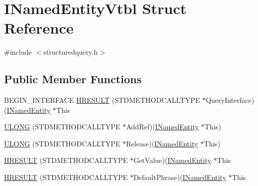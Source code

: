 \hypertarget{struct_i_named_entity_vtbl}{}\section{I\+Named\+Entity\+Vtbl Struct Reference}
\label{struct_i_named_entity_vtbl}


{\ttfamily \#include $<$structuredquery.\+h$>$}

\subsection*{Public Member Functions}
\begin{DoxyCompactItemize}
\item 
B\+E\+G\+I\+N\+\_\+\+I\+N\+T\+E\+R\+F\+A\+CE \hyperlink{struct_i_named_entity_vtbl_a8566536b76c1cc4b2bc33fb0798ad014}{H\+R\+E\+S\+U\+LT} (S\+T\+D\+M\+E\+T\+H\+O\+D\+C\+A\+L\+L\+T\+Y\+PE $\ast$Query\+Interface)(\hyperlink{structuredquery_8h_a362b4bd35d6ac9db4ca890a7847c8b21}{I\+Named\+Entity} $\ast$This
\item 
\hyperlink{struct_i_named_entity_vtbl_a8325565a4e69305ea8067130335fd3ac}{U\+L\+O\+NG} (S\+T\+D\+M\+E\+T\+H\+O\+D\+C\+A\+L\+L\+T\+Y\+PE $\ast$Add\+Ref)(\hyperlink{structuredquery_8h_a362b4bd35d6ac9db4ca890a7847c8b21}{I\+Named\+Entity} $\ast$This)
\item 
\hyperlink{struct_i_named_entity_vtbl_aeb6f2c950bb8a547f8ea0a1d3ac60deb}{U\+L\+O\+NG} (S\+T\+D\+M\+E\+T\+H\+O\+D\+C\+A\+L\+L\+T\+Y\+PE $\ast$Release)(\hyperlink{structuredquery_8h_a362b4bd35d6ac9db4ca890a7847c8b21}{I\+Named\+Entity} $\ast$This)
\item 
\hyperlink{struct_i_named_entity_vtbl_ab425338747d1e871a2d8d0b099a337b4}{H\+R\+E\+S\+U\+LT} (S\+T\+D\+M\+E\+T\+H\+O\+D\+C\+A\+L\+L\+T\+Y\+PE $\ast$Get\+Value)(\hyperlink{structuredquery_8h_a362b4bd35d6ac9db4ca890a7847c8b21}{I\+Named\+Entity} $\ast$This
\item 
\hyperlink{struct_i_named_entity_vtbl_a776243f2e53fda4668d7ad51fff459cc}{H\+R\+E\+S\+U\+LT} (S\+T\+D\+M\+E\+T\+H\+O\+D\+C\+A\+L\+L\+T\+Y\+PE $\ast$Default\+Phrase)(\hyperlink{structuredquery_8h_a362b4bd35d6ac9db4ca890a7847c8b21}{I\+Named\+Entity} $\ast$This
\end{DoxyCompactItemize}
